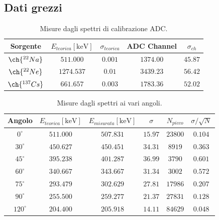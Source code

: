 \subsection{Dati grezzi}
\begin{table}[H]
    \centering
    \begin{tabular}{|c|c|c|c|c|}
    \hline
       Sorgente & $E_{teorica} [\unit{\kilo\electronvolt}]$ & $\sigma_{teorica}$ & ADC Channel & $\sigma_{ch}$\\
       \hline
       \hline
       $\ch{^{22}Na}$ & $511.000$ & $0.001$ & $1374.00$ & $45.87$\\
        \hline
       $\ch{^{22}Ne}$ & $1274.537$ & $0.01$ & $3439.23$ & $56.42$\\
       \hline
       $\ch{^{137}Cs}$ & $661.657$ & $0.003$ & $1783.36$ & $52.02$\\
       \hline
    \end{tabular}
    \caption{Misure dagli spettri di calibrazione ADC.}
    \label{tab:ADC}
\end{table}
\begin{table}[H]
    \centering
    \begin{tabular}{|c|c|c|c|c|c|}
    \hline
       Angolo & $E_{teorica} [\unit{\kilo\electronvolt}]$ & $E_{misurata}[\unit{\kilo\electronvolt}]$ & $\sigma$ & $N_{picco}$ & $\sigma/\sqrt{N}$\\
       \hline
       \hline
       $0^\circ$ & $511.000$ & $507.831$ & $15.97$ & $23800$ & $0.104$ \\
        \hline
       $30^\circ$ & $450.627$ & $450.451$ & $34.31$ & $8919$ & $0.363$ \\
       \hline
       $45^\circ$ & $395.238$ & $401.287$ & $36.99$ & $3790$ & $0.601$ \\
       \hline
       $60^\circ$ & $340.667$ & $343.667$ & $31.34$ & $3002$ & $0.572$ \\
       \hline
       $75^\circ$ & $293.479$ & $302.629$ & $27.81$ & $17986$ & $0.207$ \\
       \hline
       $90^\circ$ & $255.500$ & $259.277$ & $21.37$ & $27831$ & $0.128$ \\
       \hline
       $120^\circ$ & $204.400$ & $205.918$ & $14.11$ & $84629$ & $0.048$ \\
       \hline
    \end{tabular}
    \caption{Misure dagli spettri ai vari angoli.}
    \label{tab:appendice_spettri}
\end{table}
